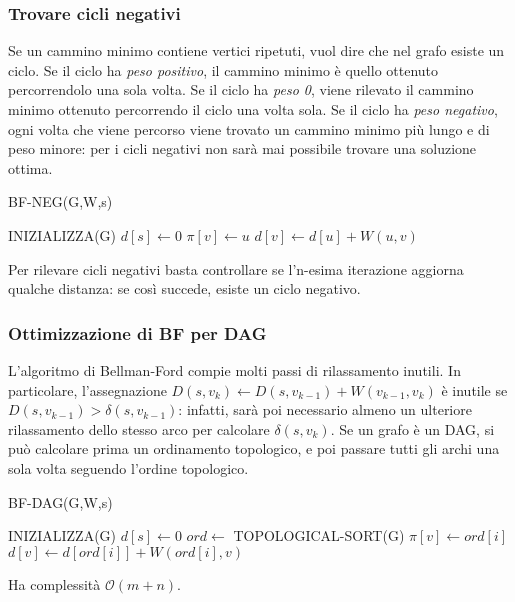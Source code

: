 \documentclass[11pt]{book}
\begin{document}
\subsubsection{Trovare cicli negativi}
Se un cammino minimo contiene vertici ripetuti, vuol dire che nel grafo esiste un ciclo.
Se il ciclo ha \textit{peso positivo}, il cammino minimo è quello ottenuto percorrendolo una sola volta.
Se il ciclo ha \textit{peso 0}, viene rilevato il cammino minimo ottenuto percorrendo il ciclo una volta sola.
Se il ciclo ha \textit{peso negativo}, ogni volta che viene percorso viene trovato un cammino minimo più lungo e di peso 
minore: per i cicli negativi non sarà mai possibile trovare una soluzione ottima.
\begin{algorithm}
    \caption{BF-NEG(G,W,s)}
    \begin{algorithmic}
        \State INIZIALIZZA(G)
        \State $d[s]\gets 0$
                    \State $\pi[v]\gets u$
                    \State $d[v]\gets d[u]+W(u,v)$
                \EndIf 
            \EndFor
        \EndFor
            \\
            \EndIf
        \EndFor 
    \end{algorithmic}
\end{algorithm}
Per rilevare cicli negativi basta controllare se l'n-esima iterazione aggiorna qualche distanza: se così succede, esiste 
un ciclo negativo.
\subsubsection{Ottimizzazione di BF per DAG}
L'algoritmo di Bellman-Ford compie molti passi di rilassamento inutili. In particolare, l'assegnazione 
$D(s,v_k)\gets D(s,v_{k-1})+W(v_{k-1},v_k)$ è inutile se $D(s,v_{k-1})>\delta(s,v_{k-1})$: infatti, sarà poi necessario 
almeno un ulteriore rilassamento dello stesso arco per calcolare $\delta(s,v_{k})$.
Se un grafo è un DAG, si può calcolare prima un ordinamento topologico, e poi passare tutti gli archi una sola volta seguendo
l'ordine topologico.
\begin{algorithm}
    \caption{BF-DAG(G,W,s)}
    \begin{algorithmic}
        \State INIZIALIZZA(G)
        \State $d[s]\gets 0$
        \State $ord\gets$ TOPOLOGICAL-SORT(G)
                    \State $\pi[v]\gets ord[i]$
                    \State $d[v]\gets d[ord[i]]+W(ord[i],v)$
                \EndIf 
            \EndFor
        \EndFor
    \end{algorithmic}
\end{algorithm}
Ha complessità $\mathcal{O}(m+n)$.
\end{document}
